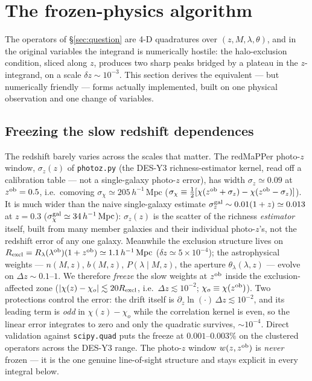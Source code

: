 \documentclass[a4paper, 11pt]{article}
\newcommand{\lob}{\lambda^{\rm ob}}
\newcommand{\zob}{z^{\rm ob}}
\newcommand{\hMpc}{h^{-1}\,\mathrm{Mpc}}
\newcommand{\Rex}{R_{\rm excl}}
\begin{document}
\section{The frozen-physics algorithm}
\label{sec:frozen_algo}

The operators of \S\ref{sec:question} are 4-D quadratures over
$(z, M, \lambda, \theta)$, and in the original variables the
integrand is numerically hostile: the halo-exclusion condition,
sliced along $z$, produces two sharp peaks bridged by a plateau
in the $z$-integrand, on a scale $\delta z\sim 10^{-3}$. This
section derives the equivalent --- but numerically friendly ---
forms actually implemented, built on one physical observation and
one change of variables.

\subsection{Freezing the slow redshift dependences}
\label{sec:freeze}

The redshift barely varies across the scales that matter. The
redMaPPer photo-$z$ window, $\sigma_z(z)$ of \texttt{photoz.py}
(the DES-Y3 richness-estimator kernel, read off a calibration
table --- not a single-galaxy photo-$z$ error), has width
$\sigma_z\simeq0.09$ at $\zob=0.5$, i.e.\ comoving
$\sigma_\chi\simeq205\,\hMpc$
($\sigma_\chi\equiv\tfrac12[\chi(\zob+\sigma_z)-\chi(\zob-\sigma_z)]$).
It is much wider than the naive single-galaxy estimate
$\sigma_z^{\rm gal}\sim0.01(1+z)\simeq0.013$ at $z=0.3$
($\sigma_\chi^{\rm gal}\simeq34\,\hMpc$): $\sigma_z(z)$ is the
scatter of the richness \emph{estimator} itself, built from many
member galaxies and their individual photo-$z$'s, not the
redshift error of any one galaxy. Meanwhile the exclusion
structure lives on
$\Rex = R_\lambda(\lob)(1+\zob)\simeq1.1\,\hMpc$
($\delta z\simeq5\times10^{-4}$); the astrophysical weights ---
$n(M,z)$, $b(M,z)$, $P(\lambda\mid M,z)$, the aperture
$\theta_\lambda(\lambda,z)$ --- evolve on $\Delta z\sim0.1$--$1$.
We therefore \emph{freeze} the slow weights at $\zob$ inside the
exclusion-affected zone ($|\chi(z)-\chi_o|\lesssim20\Rex$,
i.e.\ $\Delta z\lesssim10^{-2}$; $\chi_o\equiv\chi(\zob)$). Two
protections control the error: the drift itself is
$\partial_z\ln(\cdot)\,\Delta z\lesssim10^{-2}$, and its leading
term is \emph{odd} in $\chi(z)-\chi_o$ while the correlation
kernel is even, so the linear error integrates to zero and only
the quadratic survives, $\sim10^{-4}$. Direct validation against
\texttt{scipy.quad} puts the freeze at $0.001$--$0.003\%$ on the
clustered operators across the DES-Y3 range. The photo-$z$
window $w(z,\zob)$ is \emph{never} frozen --- it is the one
genuine line-of-sight structure and stays explicit in every
integral below.
\end{document}
